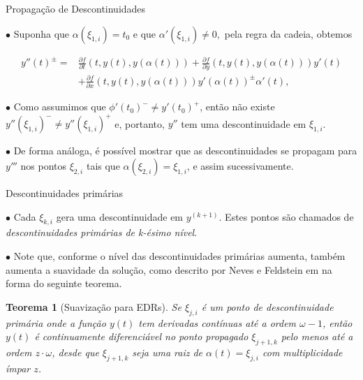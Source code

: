 \documentclass{beamer}
\theoremstyle{plain}
\newtheorem{teo}{Teorema}
\theoremstyle{definition}
\begin{document}

\begin{frame}{Propagação de Descontinuidades}

    $\bullet$ Suponha que $\alpha(\xi_{1, i}) = t_0 $ e que $ \alpha'(\xi_{1, i}) \neq 0, $ pela regra da cadeia, obtemos

    \footnotesize
    \begin{equation}
        \begin{aligned}
            y''(t)^{ \pm}= & \frac{\partial f}{\partial t}(t, y(t), y(\alpha(t)))+\frac{\partial f}{\partial y}(t, y(t), y(\alpha(t))) y'(t) \\
                           & +\frac{\partial f}{\partial x}(t, y(t), y(\alpha(t))) y'(\alpha(t))^{ \pm} \alpha'(t),
        \end{aligned}
        \label{chap2:eq:EDR:chain_rule}
    \end{equation}

    \normalsize
    $\bullet$ Como assumimos que \(\phi'(t_{0})^{-} \neq y'(t_{0})^{+}\), então não existe \(y''(\xi_{1, i})^- \neq y''(\xi_{1, i})^+\) e, portanto, $y''$ tem uma descontinuidade em $\xi_{1, i}$.

    $\bullet$ De forma análoga, é possível mostrar que as descontinuidades se propagam para $y'''$ nos pontos $\xi_{2, i}$ tais que $\alpha(\xi_{2, i}) = \xi_{1, i}$, e assim sucessivamente. 

\end{frame}



\begin{frame}{Descontinuidades primárias}

    $\bullet$ Cada $\xi_{k, i}$ gera uma descontinuidade em $y^{(k+1)}$. Estes pontos são chamados de \textit{descontinuidades primárias de k-ésimo nível}.

    $\bullet$ Note que, conforme o nível das descontinuidades primárias aumenta, também aumenta a suavidade da solução, como descrito por Neves e Feldstein em \cite{Neves1976CharacterizationOJ} na forma do seguinte teorema.


    \begin{teo}[Suavização para EDRs]
        \label{chap2:teo:EDR_smooting}
        Se \(\xi_{j, i}\) é um ponto de descontinuidade primária onde a função \(y(t)\) tem derivadas contínuas até a ordem \(\omega-1\), então \(y(t)\) é continuamente diferenciável no ponto propagado \(\xi_{j+1, k}\) pelo menos até a ordem \(z \cdot \omega\), desde que \(\xi_{j+1, k}\) seja uma raiz de \(\alpha(t) = \xi_{j, i}\) com multiplicidade ímpar \(z\).
    \end{teo}

\end{frame}
\end{document}
